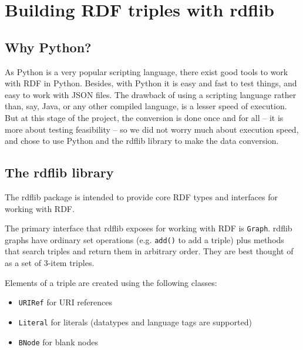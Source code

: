 \documentclass[a4paper,11pt]{report}
\begin{document}

\section{Building RDF triples with rdflib}
\subsection{Why Python?}
As Python is a very popular scripting language, there exist good tools to work with RDF in Python. Besides, with Python it is easy and fast to test things, and easy to work with JSON files. The drawback of using a scripting language rather than, say, Java, or any other compiled language, is a lesser speed of execution. But at this stage of the project, the conversion is done once and for all -- it is more about testing feasibility -- so we did not worry much about execution speed, and chose to use Python and the rdflib library to make the data conversion.

\subsection{The rdflib library}
The rdflib package is intended to provide core RDF types and interfaces for working with RDF. 

The primary interface that rdflib exposes for working with RDF is \texttt{Graph}. rdflib graphs have ordinary set operations (e.g. \texttt{add()} to add a triple) plus methods that search triples and return them in arbitrary order. They are best thought of as a set of 3-item triples. 

Elements of a triple are created using the following classes:
\begin{itemize}
\item \texttt{URIRef} for URI references
\item \texttt{Literal} for literals (datatypes and language tags are supported)
\item \texttt{BNode} for blank nodes
\end{itemize}
\end{document}
